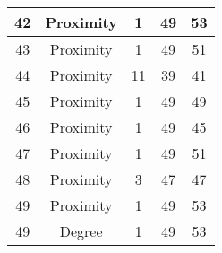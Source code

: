 \documentclass[results.tex]{subfiles}
\begin{document}
\begin{center}
\begin{tabular}{| c || c | c | c | c |}
            \hline
            42                      & Proximity                    & 1                      & 49                      & 53                   \\
            \hline
            43                      & Proximity                    & 1                      & 49                      & 51                   \\
            \hline
            44                      & Proximity                    & 11                     & 39                      & 41                   \\
            \hline
            45                      & Proximity                    & 1                      & 49                      & 49                   \\
            \hline
            46                      & Proximity                    & 1                      & 49                      & 45                   \\
            \hline
            47                      & Proximity                    & 1                      & 49                      & 51                   \\
            \hline
            48                      & Proximity                    & 3                      & 47                      & 47                   \\
            \hline
            49                      & Proximity                    & 1                      & 49                      & 53                   \\
            \hline
            49                      & Degree                       & 1                      & 49                      & 53                   \\
            \hline
        \end{tabular}
    \end{center}
\end{document}
